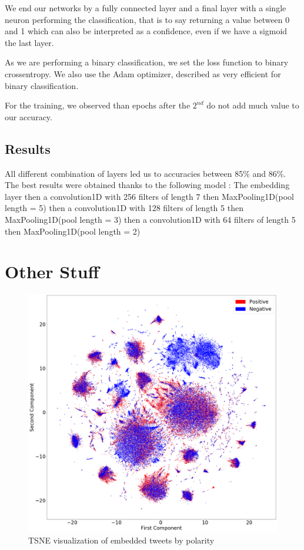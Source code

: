 \documentclass[10pt,conference,compsocconf,retainorgcmds]{IEEEtran}
\begin{document}
We end our networks by a fully connected layer and a final layer with a single neuron performing the classification, that is to say returning a value between 0 and 1 which can also be interpreted as a confidence, even if we have a sigmoid the last layer.

As we are performing a binary classification, we set the loss function to binary crossentropy. We also use the Adam optimizer, described as very efficient for binary classification.

For the training, we observed than epochs after the $2^{nd}$ do not add much value to our accuracy.

\subsection{Results}

All different combination of layers led us to accuracies between 85\% and 86\%.
The best results were obtained thanks to the following model : The embedding layer then a convolution1D with 256 filters of length 7 then MaxPooling1D(pool length = 5) then a convolution1D with 128 filters of length 5 then MaxPooling1D(pool length = 3) then a convolution1D with 64 filters of length 5 then MaxPooling1D(pool length = 2) 

\section{Other Stuff}
\begin{figure}[h]
    \centering
    \includegraphics[width=\linewidth]{imag/tweets_tsne.png}
    \caption{TSNE visualization of embedded tweets by polarity}
    \label{fig:my_label}
\end{figure}
\end{document}
